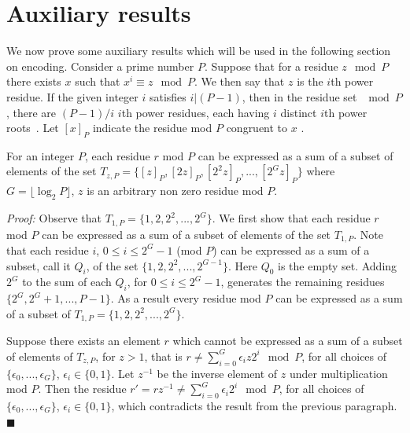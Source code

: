 \section{Auxiliary results}\label{aux}
We now prove some auxiliary results which will be used in the
following section on encoding. Consider a prime number $P$.
Suppose that for a residue $z \mod P$ there exists $x$ such that
$x^i \equiv z \mod P$. We then say that $z$ is the $i$th power
residue. If the given integer $i$ satisfies $i |(P-1)$, then in
the residue set $\mod P$, there are $(P-1)/i$ $i$th power
residues, each having $i$ distinct $i$th power
roots~\cite{apostol}. Let $[x]_P$ indicate the residue mod $P$
congruent to $x$ .

\begin{lemma}\label{generates} For an integer $P$, each residue $r$ mod $P$ can be expressed as a
sum of a subset of elements of the set
$T_{z,P}=\{[z]_P,[2z]_P,[2^2z]_P,...,[2^{G}z]_P\}$ where
$G=\lfloor \log_2 P \rfloor $, $z$ is an arbitrary non zero
residue mod $P$.
\end{lemma}

\noindent \textit{Proof:} Observe that
$T_{1,P}=\{1,2,2^2,...,2^{G}\}$. We first show that each residue
$r$ mod $P$ can be expressed as a sum of a subset of elements of
the set $T_{1,P}$. Note that each residue $i$, $0 \leq i \leq
2^G-1$ (mod $P$) can be expressed as a sum of a subset, call it
$Q_i$, of the set $\{1,2,2^2,...,2^{G-1}\}$. Here $Q_0$ is the
empty set. Adding $2^G$ to the sum of each $Q_i$, for $0 \leq i
\leq 2^G-1$, generates the remaining residues $\{2^G,
2^G+1,...,P-1 \}$. As a result every residue mod $P$ can be
expressed as a sum of a subset of $T_{1,P}=\{1,2,2^2,...,2^{G}\}$.

Suppose there exists an element $r$ which cannot be expressed as a
sum of a subset of elements of $T_{z,P}$, for $z>1$, that is $r
\neq \sum_{i=0}^G \epsilon_i z 2^i \mod P$, for all choices of
$\{\epsilon_0,...,\epsilon_G\}$, $\epsilon_i \in \{0,1\}$. Let
$z^{-1}$ be the inverse element of $z$ under multiplication mod
$P$. Then the residue $r' = rz^{-1} \neq \sum_{i=0}^G \epsilon_i
2^i \mod P$, for all choices of $\{\epsilon_0,...,\epsilon_G\}$,
$\epsilon_i \in \{0,1\}$, which contradicts the result from the
previous paragraph.\hfill$\blacksquare$


